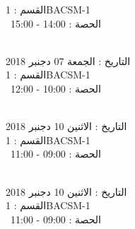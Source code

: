 القسم : 1BACSM-1 \\
 \  
الحصة : 14:00 - 15:00 \\
\par
\noindent\makebox[\linewidth]{\rule{\paperwidth}{0.4pt}}
 \\
التاريخ : الجمعة 07 دجنبر 2018 \\
القسم : 1BACSM-1 \\
 \  
الحصة : 10:00 - 12:00 \\
\par
\noindent\makebox[\linewidth]{\rule{\paperwidth}{0.4pt}}
 \\
التاريخ : الاثنين 10 دجنبر 2018 \\
القسم : 1BACSM-1 \\
 \  
الحصة : 09:00 - 11:00 \\
\par
\noindent\makebox[\linewidth]{\rule{\paperwidth}{0.4pt}}
 \\
التاريخ : الاثنين 10 دجنبر 2018 \\
القسم : 1BACSM-1 \\
 \  
الحصة : 09:00 - 11:00 \\
